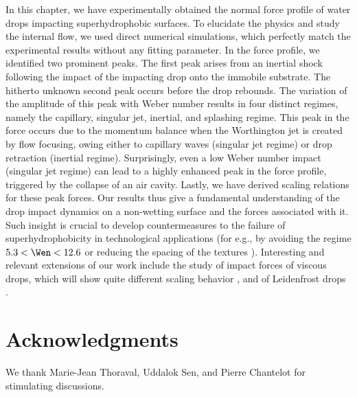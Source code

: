In this chapter, we have experimentally obtained the normal force profile of water drops impacting superhydrophobic surfaces. To elucidate the physics and study the internal flow, we used direct numerical simulations, which perfectly match the experimental results without any fitting parameter. In the force profile, we identified two prominent peaks. The first peak arises from an inertial shock following the impact of the impacting drop onto the immobile substrate. The hitherto unknown second peak occurs before the drop rebounds. The variation of the amplitude of this peak with Weber number results in four distinct regimes, namely the capillary, singular jet, inertial, and splashing regime. This peak in the force occurs due to the momentum balance when the Worthington jet is created by flow focusing, owing either to capillary waves (singular jet regime) or drop retraction (inertial regime). Surprisingly, even a low Weber number impact (singular jet regime) can lead to a highly enhanced peak in the force profile, triggered by the collapse of an air cavity. Lastly, we have derived scaling relations for these peak forces. Our results thus give a fundamental understanding of the drop impact dynamics on a non-wetting surface and the forces associated with it. Such insight is crucial to develop countermeasures to the failure of superhydrophobicity in technological applications (for e.g., by avoiding the regime $5.3 < \Wen < 12.6$ or reducing the spacing of the textures \cite{lafuma2003}). Interesting and relevant extensions of our work include the study of impact forces of viscous drops, which will show quite different scaling behavior \cite{jha2020viscous}, and of Leidenfrost drops \cite{quere2013leidenfrost}.

\section*{Acknowledgments}
We thank Marie-Jean Thoraval, Uddalok Sen, and Pierre Chantelot for stimulating discussions.


